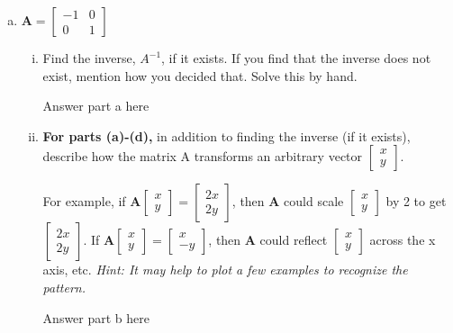 \documentclass[11pt]{article}
\def\A{\textbf{A}} %
\begin{document}
\begin{enumerate}
\begin{enumerate}[(a)]
	      	\newpage
	      	\item $\A = \begin{bmatrix}
	      	      -1 & 0 \\
	      	      0 & 1
	      	\end{bmatrix}$
	      	\begin{enumerate}[i.]
	      		\item Find the inverse, $A^{-1}$, if it exists. If you find that the inverse does not exist, mention how you decided that. Solve this by hand.
	      		      \begin{Answer}
	      		      	Answer part a here
	      		      \end{Answer}
	      		\item \textbf{For parts (a)-(d),} in addition to finding the inverse (if it exists), describe how the matrix A transforms an arbitrary vector $\begin{bmatrix}
	      		      x \\
	      		      y
	      		\end{bmatrix}$.
	      			      			      		                    
	      		For example, if $\A \begin{bmatrix}
	      		x \\
	      		y
	      		\end{bmatrix} = \begin{bmatrix}
	      		2x \\
	      		2y
	      		\end{bmatrix}$, then $\A$ could scale $\begin{bmatrix}
	      		x \\
	      		y
	      		\end{bmatrix}$ by 2 to get $\begin{bmatrix}
	      		2x \\
	      		2y
	      		\end{bmatrix}$. If $\A \begin{bmatrix}
	      		x \\
	      		y
	      		\end{bmatrix}
	      		=
	      		\begin{bmatrix}
	      			x  \\
	      			-y 
	      		\end{bmatrix}$, then $\A$ could reflect $\begin{bmatrix}
	      		x \\
	      		y
	      		\end{bmatrix}$ across the x axis, etc. \textit{Hint: It may help to plot a few examples to recognize the pattern.}
	      		\begin{Answer}
	      			Answer part b here
	      		\end{Answer}
	      	\end{enumerate}
	      		      		      	

\end{enumerate}
\end{enumerate}
\end{document}

